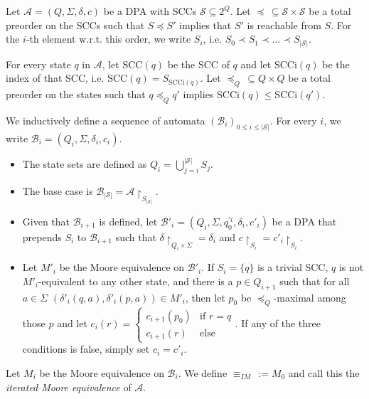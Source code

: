 \begin{defn}
\label{def:fwe:itmoore}
	Let $\mathcal{A} = (Q, \Sigma, \delta, c)$ be a DPA with SCCs $\mathcal{S} \subseteq 2^Q$. Let $\preceq \,\subseteq \mathcal{S} \times \mathcal{S}$ be a total preorder on the SCCs such that $S \preceq S'$ implies that $S'$ is reachable from $S$. For the $i$-th element w.r.t. this order, we write $S_i$, i.e. $S_0 \prec S_1 \prec \dots \prec S_{|\mathcal{S}|}$. 
	
	For every state $q$ in $\mathcal{A}$, let $\text{SCC}(q)$ be the SCC of $q$ and let $\text{SCCi}(q)$ be the index of that SCC, i.e. $\text{SCC}(q) = S_{\text{SCCi}(q)}$. Let $\preceq_Q \,\subseteq Q \times Q$ be a total preorder on the states such that $q \preceq_Q q'$ implies $\text{SCCi}(q) \leq \text{SCCi}(q')$.
	
	We inductively define a sequence of automata $(\mathcal{B}_i)_{0 \leq i \leq |\mathcal{S}|}$. For every $i$, we write $\mathcal{B}_i = (Q_i, \Sigma, \delta_i, c_i)$.
	
	\begin{itemize}
		\item The state sets are defined as $Q_i = \bigcup_{j=i}^{|\mathcal{S}|} S_j$.
		\item The base case is $\mathcal{B}_{|\mathcal{S}|} = \mathcal{A}\upharpoonright_{S_{|\mathcal{S}|}}$.
		\item Given that $\mathcal{B}_{i+1}$ is defined, let $\mathcal{B}'_i = (Q_i, \Sigma, q_0^{\prime i}, \delta_i, c'_i)$ be a DPA that prepends $S_i$ to $\mathcal{B}_{i+1}$ such that $\delta \upharpoonright_{Q_i \times \Sigma} = \delta_i$ and $c \upharpoonright_{S_i} = c'_i \upharpoonright_{S_i}$.
		\item Let $M'_i$ be the Moore equivalence on $\mathcal{B}'_i$. If $S_i = \{q\}$ is a trivial SCC, $q$ is not $M'_i$-equivalent to any other state, and there is a $p \in Q_{i+1}$ such that for all $a \in \Sigma$ $(\delta'_i(q, a), \delta'_i(p, a)) \in M'_i$, then let $p_0$ be $\preceq_Q$-maximal among those $p$ and let $c_i(r) = \begin{cases} c_{i+1}(p_0) & \text{if } r = q \\ c_{i+1}(r) & \text{else} \end{cases}$. If any of the three conditions is false, simply set $c_i = c'_i$.
	\end{itemize} 
	
	Let $M_i$ be the Moore equivalence on $\mathcal{B}_i$. We define $\equiv_{IM} \,:= M_0$ and call this the \emph{iterated Moore equivalence} of $\mathcal{A}$.
\end{defn}

